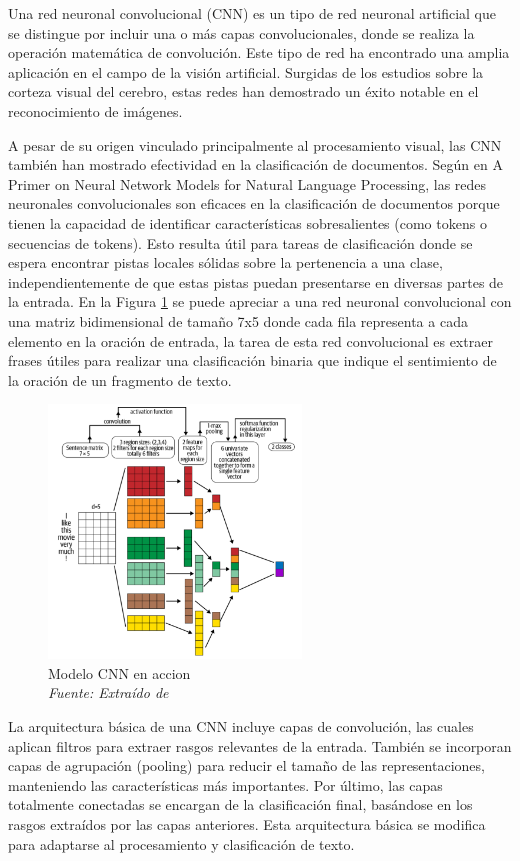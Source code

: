 Una red neuronal convolucional (CNN) es un tipo de red neuronal artificial que se distingue por incluir una o más capas convolucionales, donde se realiza la operación matemática de convolución. Este tipo de red ha encontrado una amplia aplicación en el campo de la visión artificial. Surgidas de los estudios sobre la corteza visual del cerebro, estas redes han demostrado un éxito notable en el reconocimiento de imágenes.


A pesar de su origen vinculado principalmente al procesamiento visual, las CNN también han mostrado efectividad en la clasificación de documentos. Según \cite{goldberg2016primer} en A Primer on Neural Network Models for Natural Language Processing, las redes neuronales convolucionales son eficaces en la clasificación de documentos porque tienen la capacidad de identificar características sobresalientes (como tokens o secuencias de tokens). Esto resulta útil para tareas de clasificación donde se espera encontrar pistas locales sólidas sobre la pertenencia a una clase, independientemente de que estas pistas puedan presentarse en diversas partes de la entrada. En la Figura \ref{fig:an9} se puede apreciar a una red neuronal convolucional con una matriz bidimensional de tamaño 7x5 donde cada fila representa a cada elemento en la oración de entrada, la tarea de esta red convolucional es extraer frases útiles para realizar una clasificación binaria que indique el sentimiento de la oración de un fragmento de texto.
\begin{figure}[h!]
	\includegraphics[width=0.6\textwidth]{capitulo2/figuras/an9.png}
	\caption[Modelo CNN en accion]{Modelo CNN en accion
		\\\textit{Fuente: Extraído de} \protect\cite[p. 25]{vajjala2020practical}}
	\label{fig:an9}
\end{figure}

La arquitectura básica de una CNN incluye capas de convolución, las cuales aplican filtros para extraer rasgos relevantes de la entrada. También se incorporan capas de agrupación (pooling) para reducir el tamaño de las representaciones, manteniendo las características más importantes. Por último, las capas totalmente conectadas se encargan de la clasificación final, basándose en los rasgos extraídos por las capas anteriores. Esta arquitectura básica se modifica para adaptarse al procesamiento y clasificación de texto.

